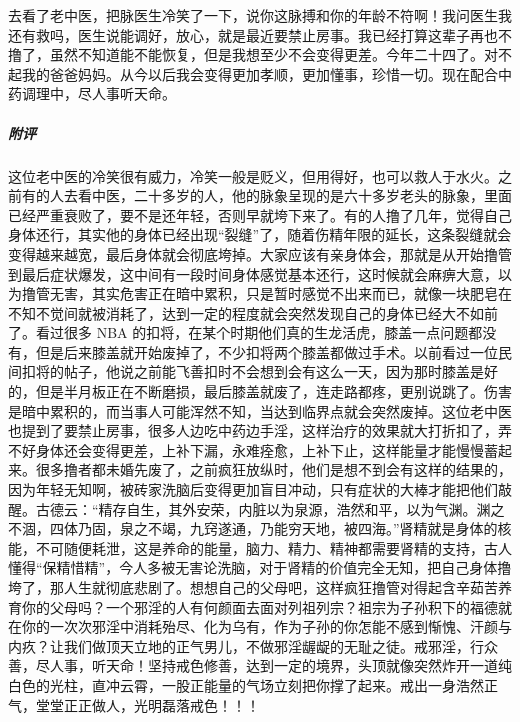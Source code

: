 \begin{case}
    去看了老中医，把脉医生冷笑了一下，说你这脉搏和你的年龄不符啊！我问医生我还有救吗，医生说能调好，放心，就是最近要禁止房事。我已经打算这辈子再也不撸了，虽然不知道能不能恢复，但是我想至少不会变得更差。今年二十四了。对不起我的爸爸妈妈。从今以后我会变得更加孝顺，更加懂事，珍惜一切。现在配合中药调理中，尽人事听天命。
    \subparagraph{附评} 这位老中医的冷笑很有威力，冷笑一般是贬义，但用得好，也可以救人于水火。之前有的人去看中医，二十多岁的人，他的脉象呈现的是六十多岁老头的脉象，里面已经严重衰败了，要不是还年轻，否则早就垮下来了。有的人撸了几年，觉得自己身体还行，其实他的身体已经出现“裂缝”了，随着伤精年限的延长，这条裂缝就会变得越来越宽，最后身体就会彻底垮掉。大家应该有亲身体会，那就是从开始撸管到最后症状爆发，这中间有一段时间身体感觉基本还行，这时候就会麻痹大意，以为撸管无害，其实危害正在暗中累积，只是暂时感觉不出来而已，就像一块肥皂在不知不觉间就被消耗了，达到一定的程度就会突然发现自己的身体已经大不如前了。看过很多 NBA 的扣将，在某个时期他们真的生龙活虎，膝盖一点问题都没有，但是后来膝盖就开始废掉了，不少扣将两个膝盖都做过手术。以前看过一位民间扣将的帖子，他说之前能飞善扣时不会想到会有这么一天，因为那时膝盖是好的，但是半月板正在不断磨损，最后膝盖就废了，连走路都疼，更别说跳了。伤害是暗中累积的，而当事人可能浑然不知，当达到临界点就会突然废掉。这位老中医也提到了要禁止房事，很多人边吃中药边手淫，这样治疗的效果就大打折扣了，弄不好身体还会变得更差，上补下漏，永难痊愈，上补下止，这样能量才能慢慢蓄起来。很多撸者都未婚先废了，之前疯狂放纵时，他们是想不到会有这样的结果的，因为年轻无知啊，被砖家洗脑后变得更加盲目冲动，只有症状的大棒才能把他们敲醒。古德云：“精存自生，其外安荣，内脏以为泉源，浩然和平，以为气渊。渊之不涸，四体乃固，泉之不竭，九窍遂通，乃能穷天地，被四海。”肾精就是身体的核能，不可随便耗泄，这是养命的能量，脑力、精力、精神都需要肾精的支持，古人懂得“保精惜精”，今人多被无害论洗脑，对于肾精的价值完全无知，把自己身体撸垮了，那人生就彻底悲剧了。想想自己的父母吧，这样疯狂撸管对得起含辛茹苦养育你的父母吗？一个邪淫的人有何颜面去面对列祖列宗？祖宗为子孙积下的福德就在你的一次次邪淫中消耗殆尽、化为乌有，作为子孙的你怎能不感到惭愧、汗颜与内疚？让我们做顶天立地的正气男儿，不做邪淫龌龊的无耻之徒。戒邪淫，行众善，尽人事，听天命！坚持戒色修善，达到一定的境界，头顶就像突然炸开一道纯白色的光柱，直冲云霄，一股正能量的气场立刻把你撑了起来。戒出一身浩然正气，堂堂正正做人，光明磊落戒色！！！
\end{case}

